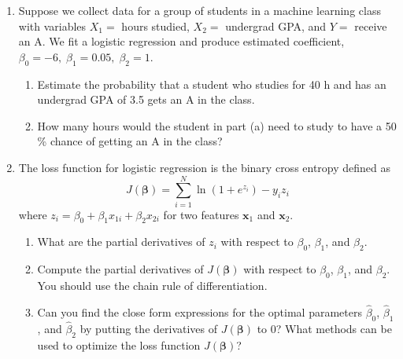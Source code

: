 \documentclass[11pt]{article}
\newcommand{\xbf}{\mathbf{x}}
\def\betabf{{\boldsymbol \beta}}
\begin{document}
\begin{enumerate}
\begin{enumerate}[(a)]
\end{enumerate}

\item Suppose we collect data for a group of students in a machine learning class
with variables $X_1 =$ hours studied, $X_2 =$ undergrad GPA, and $Y =$
receive an A. We fit a logistic regression and produce estimated
coefficient, $\beta_0 = -6, \;\beta_1 = 0.05,\; \beta_2 = 1$.

\begin{enumerate}
    \item  Estimate the probability that a student who studies for 40 h and
has an undergrad GPA of 3.5 gets an A in the class.


\item  How many hours would the student in part (a) need to study to
have a 50 \% chance of getting an A in the class?
\end{enumerate}

\item The loss function for logistic regression is the binary cross entropy defined as $$J(\betabf)=\sum_{i=1}^N\ln(1+e^{z_i})-y_iz_i$$ where $z_i = \beta_0+\beta_1x_{1i}+\beta_2x_{2i}$ for two features $\xbf_1$ and $\xbf_2$.
\begin{enumerate}
    \item What are the partial derivatives of $z_i$ with respect to $\beta_0$, $\beta_1$, and $\beta_2$.
    \item Compute the partial derivatives of $J(\betabf)$ with respect to $\beta_0$, $\beta_1$, and $\beta_2$. You should use the chain rule of differentiation. 
    \item Can you find the close form expressions for the optimal parameters $\hat{\beta}_0$, $\hat{\beta}_1$, and $\hat{\beta}_2$ by putting the derivatives of $J(\betabf)$ to 0? What methods can be used to optimize the loss function $J(\betabf)$?
\end{enumerate}
\end{enumerate}
\end{document}
